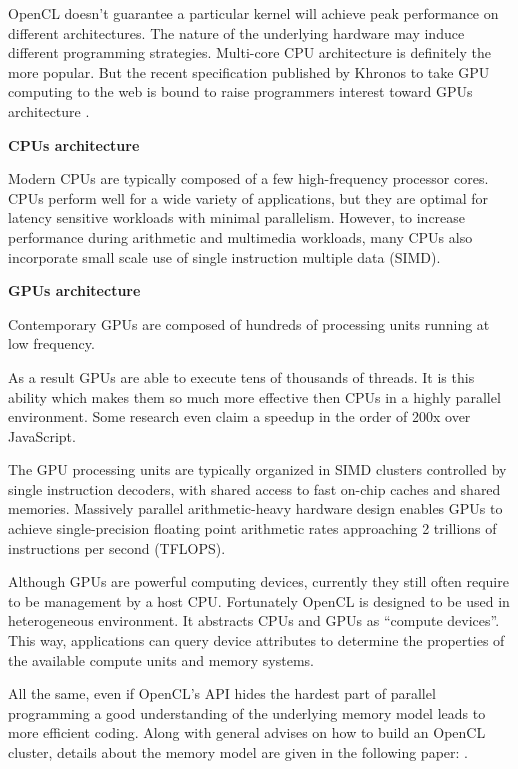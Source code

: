 OpenCL doesn't guarantee a particular kernel will achieve peak performance on
different architectures. The nature of the underlying hardware may induce
different programming strategies. Multi-core CPU architecture is definitely the
more popular. But the recent specification published by Khronos to take GPU
computing to the web is bound to raise programmers interest toward GPUs
architecture \citep{Reference30}. 

\textbf{CPUs architecture}

Modern CPUs are typically composed of a few high-frequency processor cores.
CPUs perform well for a wide variety of applications, but they are optimal for
latency sensitive workloads with minimal parallelism. However, to increase
performance during arithmetic and multimedia workloads,  many CPUs also
incorporate small scale use of single instruction multiple data (SIMD).

\textbf{GPUs architecture}

Contemporary GPUs are composed of hundreds of processing units running at low
frequency. 

As a result GPUs are able to execute tens of thousands of threads. It is this
ability which makes them so much more effective then CPUs in a highly parallel
environment. Some research even claim a speedup in the order of 200x over
JavaScript. \citep{Reference3}

The GPU processing units are typically organized in SIMD clusters controlled by
single instruction decoders, with shared access to fast on-chip caches and
shared memories. Massively parallel arithmetic-heavy hardware design enables
GPUs to achieve single-precision floating point arithmetic rates approaching 2
trillions of instructions per second (TFLOPS). \citep{Reference5}

Although GPUs are powerful computing devices, currently they still often
require to be management by a host CPU. Fortunately OpenCL is designed to be used in
heterogeneous environment. It abstracts CPUs and GPUs as “compute devices”.
This way, applications can query device attributes to determine the
properties of the available compute units and memory systems.
\citep{Reference5}

All the same, even if OpenCL's API hides the hardest part of parallel
programming a good understanding of the underlying memory model leads to more
efficient coding. Along with general advises on how to build an OpenCL
cluster, details about the memory model are given in the following paper:
\citep{Reference4}.


